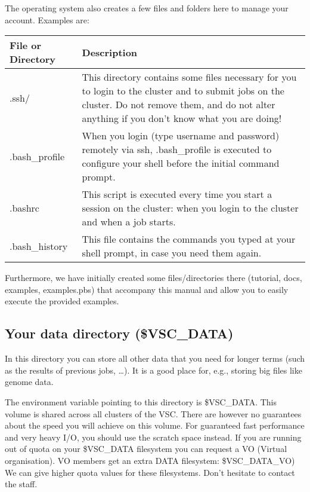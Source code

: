 The operating system also creates a few files and folders here to manage your
account. Examples are:

\begin{tabular}{|p{}|p{}|} \hline
\textbf{File or Directory} & \textbf{Description} \\ \hline
.ssh/                      & This directory contains some files necessary for you to login to the cluster and to submit jobs on the cluster. Do not remove them, and do not alter anything if you don't know what you are doing! \\ \hline
.bash\_profile             & When you login (type username and password) remotely via ssh, .bash\_profile is executed to configure your shell before the initial command prompt. \\ \hline
.bashrc                    & This script is executed every time you start a session on the cluster: when you login to the cluster and when a job starts. \\ \hline
.bash\_history             & This file contains the commands you typed at your shell prompt, in case you need them again. \\ \hline
\end{tabular}

\ifgent
\else
Furthermore, we have initially created some files/directories there (tutorial,
docs,  examples, examples.pbs) that accompany  this manual and allow you to
easily execute the provided examples.
\fi

\subsection{Your data directory (\$VSC\_DATA)\label{subsec:data-directory}}

In this directory you can store all other data that you need for longer terms
(such as the results of previous jobs, \ldots). It is a good place for, e.g.,
storing big files like genome data.

The environment variable pointing to this directory is \$VSC\_DATA.
This volume is shared across all
clusters of the VSC. There are however no guarantees about the
speed you will achieve on this volume. For guaranteed fast performance and very heavy I/O,
you should use the scratch space instead.
\ifgent
If you are running out of quota on your \$VSC\_DATA filesystem you can
request a VO (Virtual organisation). VO members get an extra DATA filesystem: \$VSC\_DATA\_VO)
We can give higher quota values for these filesystems. Don't hesitate to contact the \hpcTeam staff.
\fi

